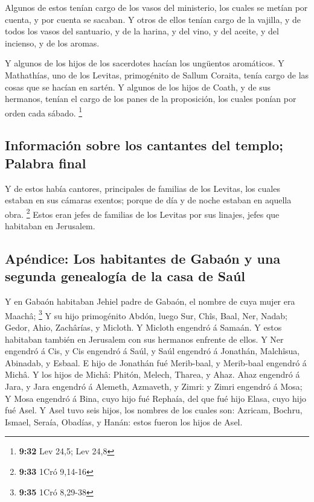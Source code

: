  Algunos de estos tenían cargo de los vasos del ministerio,
los cuales se metían por cuenta, y por cuenta se sacaban. 
Y otros de ellos tenían cargo de la vajilla, y de todos los vasos del
santuario, y de la harina, y del vino, y del aceite, y del incienso, y
de los aromas.

 Y algunos de los hijos de los sacerdotes hacían los
ungüentos aromáticos.  Y Mathathías, uno de los Levitas,
primogénito de Sallum Coraita, tenía cargo de las cosas que se hacían en
sartén.  Y algunos de los hijos de Coath, y de sus
hermanos, tenían el cargo de los panes de la proposición, los cuales
ponían por orden cada sábado. \footnote{\textbf{9:32} Lev 24,5; Lev 24,8}

\hypertarget{informaciuxf3n-sobre-los-cantantes-del-templo-palabra-final}{%
\subsection{Información sobre los cantantes del templo; Palabra
final}\label{informaciuxf3n-sobre-los-cantantes-del-templo-palabra-final}}

 Y de estos había cantores, principales de familias de los
Levitas, los cuales estaban en sus cámaras exentos; porque de día y de
noche estaban en aquella obra. \footnote{\textbf{9:33} 1Cró 9,14-16}
 Estos eran jefes de familias de los Levitas por sus
linajes, jefes que habitaban en Jerusalem.

\hypertarget{apuxe9ndice-los-habitantes-de-gabauxf3n-y-una-segunda-genealoguxeda-de-la-casa-de-sauxfal}{%
\subsection{Apéndice: Los habitantes de Gabaón y una segunda genealogía
de la casa de
Saúl}\label{apuxe9ndice-los-habitantes-de-gabauxf3n-y-una-segunda-genealoguxeda-de-la-casa-de-sauxfal}}

 Y en Gabaón habitaban Jehiel padre de Gabaón, el nombre de
cuya mujer era Maachâ; \footnote{\textbf{9:35} 1Cró 8,29-38}
 Y su hijo primogénito Abdón, luego Sur, Chîs, Baal, Ner,
Nadab;  Gedor, Ahio, Zachârías, y Micloth.  Y
Micloth engendró á Samaán. Y estos habitaban también en Jerusalem con
sus hermanos enfrente de ellos.  Y Ner engendró á Cis, y
Cis engendró á Saúl, y Saúl engendró á Jonathán, Malchîsua, Abinadab, y
Esbaal.  E hijo de Jonathán fué Merib-baal, y Merib-baal
engendró á Michâ.  Y los hijos de Michâ: Phitón, Melech,
Tharea, y Ahaz.  Ahaz engendró á Jara, y Jara engendró á
Alemeth, Azmaveth, y Zimri: y Zimri engendró á Mosa;  Y
Mosa engendró á Bina, cuyo hijo fué Rephaía, del que fué hijo Elasa,
cuyo hijo fué Asel.  Y Asel tuvo seis hijos, los nombres de
los cuales son: Azricam, Bochru, Ismael, Seraía, Obadías, y Hanán: estos
fueron los hijos de Asel.

